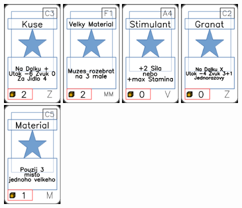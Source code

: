 \documentclass[a4paper]{article}
\begin{document}
	\includegraphics[width=3.0cm]{img-1_102}
	\includegraphics[width=3.0cm]{img-1_55}
	\includegraphics[width=3.0cm]{img-1_63}
	\includegraphics[width=3.0cm]{img-1_101}
	\includegraphics[width=3.0cm]{img-1_44}
\end{document}
